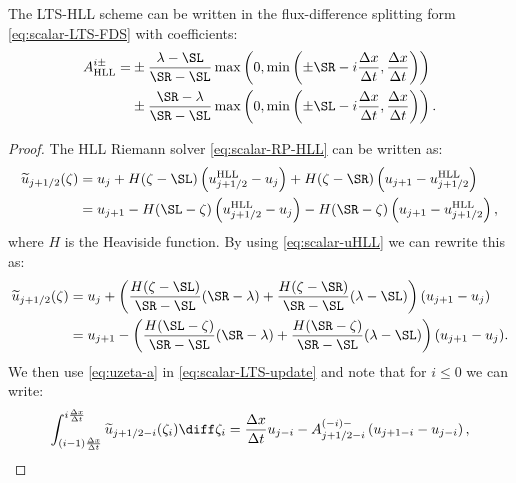 \begin{proposition} \label{prop:LTS-HLL-A}
The LTS-HLL scheme can be written in the flux-difference splitting form \eqref{eq:scalar-LTS-FDS} with coefficients:
\begin{align} \label{eq:scalar-LTS-HLL-A}
A_\text{HLL}^{i\pm} = & \pm \frac{\lambda - \SL}{\SR - \SL} \max \left( 0, \min \left( \pm \SR - i \frac{\Delta x}{\Delta t}, \frac{\Delta x}{\Delta t} \right) \right) \notag \\
& \pm \frac{\SR - \lambda}{\SR - \SL} \max \left( 0, \min \left( \pm \SL - i \frac{\Delta x}{\Delta t}, \frac{\Delta x}{\Delta t} \right) \right). 
\end{align}
\end{proposition}

\begin{proof}
The HLL Riemann solver \eqref{eq:scalar-RP-HLL} can be written as:
\begin{subequations}
\begin{align}
\widetilde{u}_{j+1/2}(\zeta) & = u_j + H(\zeta - \SL) \left( u_{j+1/2}^\text{HLL} - u_j \right) + H( \zeta - \SR) \left( u_{j+1} - u_{j+1/2}^\text{HLL} \right) \\
&=u_{j+1}-H(\SL-\zeta)\left(u_{j+1/2}^\text{HLL}-u_j\right)-H(\SR-\zeta)\left(u_{j+1}-u_{j+1/2}^\text{HLL}\right),
\end{align}
\end{subequations}
where $H$ is the Heaviside function. By using \eqref{eq:scalar-uHLL} we can rewrite this as:
\begin{subequations}
\begin{align}
\widetilde{u}_{j+1/2}(\zeta) 
& = 
u_j +
\left( \frac{H(\zeta-\SL)}{\SR-\SL}(\SR-\lambda) +
\frac{H(\zeta-\SR)}{\SR-\SL}(\lambda-\SL)
\right) (u_{j+1}-u_j) \label{eq:uzeta-a} \\
& = u_{j+1} -
\left( \frac{H(\SL-\zeta)}{\SR-\SL}(\SR-\lambda) +
\frac{H(\SR-\zeta)}{\SR-\SL}(\lambda-\SL)
\right)(u_{j+1}-u_j). \label{eq:uzeta-b}
\end{align}
\end{subequations}
We then use \eqref{eq:uzeta-a} in \eqref{eq:scalar-LTS-update} and note that for $i\leq 0$ we can write:
\begin{equation}\label{eq:negi}
\int_{(i-1)\frac{\Delta x}{\Delta t}}^{i\frac{\Delta x}{\Delta t}} \widetilde{u}_{j+1/2-i} (\zeta_i) \diff \zeta_i = 
\frac{\Delta x}{\Delta t} u_{j-i}-A_{j+1/2-i}^{(-i)-}\left(u_{j+1-i}-u_{j-i}\right),
\end{equation}

\end{proof}
